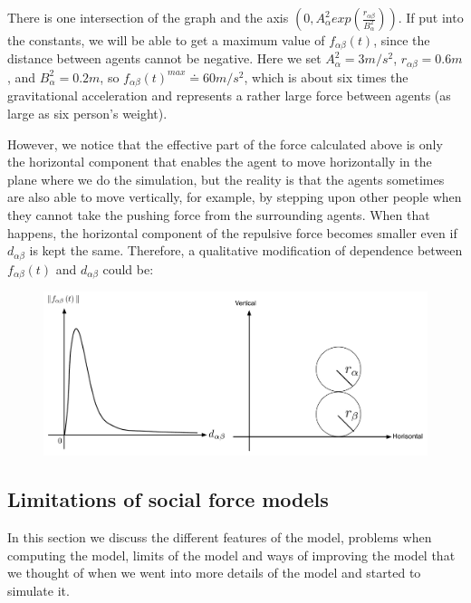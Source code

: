 There is one intersection of the graph and the axis $ \left( 0, A_{\alpha}^{2} exp\left( \frac{r_{\alpha\beta} }{B_{\alpha}^{2}}\right)  \right) $. 
If put into the constants, we will be able to get a maximum value of $ f_{\alpha\beta}(t) $, 
since the distance between agents cannot be negative. Here we set $ A_{\alpha}^{2} = 3 m/s^{2} $, 
$ r_{\alpha\beta} = 0.6 m $, and $ B_{\alpha}^{2} = 0.2 m $, so $ f_{\alpha\beta}(t)^{max} \doteq 60 m/s^{2} $, 
which is about six times the gravitational acceleration and represents a rather 
large force between agents (as large as six person's weight).

However, we notice that the effective part of the force calculated above is only the horizontal 
component that enables the agent to move horizontally in the plane where we do the simulation, 
but the reality is that the agents sometimes are also able to move vertically, for example, 
by stepping upon other people when they cannot take the pushing force from the surrounding agents. 
When that happens, the horizontal component of the repulsive force becomes smaller even if 
$d_{\alpha\beta}$ is kept the same.	
Therefore, a qualitative modification of dependence between $ f_{\alpha\beta}(t) $ 
and $ d_{\alpha\beta} $ could be:

\begin{figure}[hb]   
\centering
    {\includegraphics[scale=0.35]{Figures/ForceOverlapping.pdf}} 
    \caption{}
    \label{forceoverlapping}
\end{figure}
 

\subsection{Limitations of social force models}
In this section we discuss the different features of the model, problems when 
computing the model, limits of the model and ways of improving the model that 
we thought of when we went into more details of the model and started to 
simulate it.

